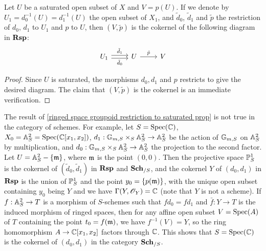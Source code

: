 \begin{lemma}\label{ringed space groupoid restriction to saturated prop}
Let $U$ be a saturated open subset of $X$ and $V=p(U)$. If we denote by $U_1=d_0^{-1}(U)=d_1^{-1}(U)$ the open subset of $X_1$, and $\tilde{d}_0$, $\tilde{d}_1$ and $\tilde{p}$ the restriction of $d_0$, $d_1$ to $U_1$ and $p$ to $U$, then $(V,\tilde{p})$ is the cokernel of the following diagram in $\Rsp$:
\[\begin{tikzcd}
U_1\ar[r,shift left=2pt,"\tilde{d}_1"]\ar[r,shift right=2pt,swap,"\tilde{d}_0"]&U\ar[r,"\tilde{p}"]&V
\end{tikzcd}\]
\end{lemma}
\begin{proof}
Since $U$ is saturated, the morphisms $d_0,d_1$ and $p$ restricts to give the desired diagram. The claim that $(V,\tilde{p})$ is the cokernel is an immediate verification.
\end{proof}

\begin{remark}
The result of \cref{ringed space groupoid restriction to saturated prop} is not true in the category of schemes. For example, let $S=\Spec(\C)$, $X_0=\A_S^2=\Spec(\C[x_1,x_2])$, $d_1:\G_{m,S}\times_S\A_S^2\to\A_S^2$ be the action of $\G_{m,S}$ on $\A_S^2$ by multiplication, and $d_0:\G_{m,S}\times_S\A_S^2\to\A_S^2$ the projection to the second factor. Let $U=\A_S^2-\{\m\}$, where $\m$ is the point $(0,0)$. Then the projective space $\P_S^1$ is the cokernel of $(\tilde{d}_0,\tilde{d}_1)$ in $\Rsp$ and $\Sch_{/S}$, and the cokernel $Y$ of $(d_0,d_1)$ in $\Rsp$ is the union of $\P^1_S$ and the point $y_0=\{p(\m)\}$, with the unique open subset containing $y_0$ being $Y$ and we have $\Gamma(Y,\mathscr{O}_Y)=\C$ (note that $Y$ is not a scheme). If $f:\A_S^2\to T$ is a morphism of $S$-schemes such that $fd_0=fd_1$ and $\bar{f}:Y\to T$ is the induced morphism of ringed spaces, then for any affine open subset $V=\Spec(A)$ of $T$ containing the point $t_0=f(\m)$, we have $f^{-1}(V)=Y$, so the ring homomorphism $A\to\C[x_1,x_2]$ factors through $\C$. This shows that $S=\Spec(\C)$ is the cokernel of $(d_0,d_1)$ in the category $\Sch_{/S}$.
\end{remark}

